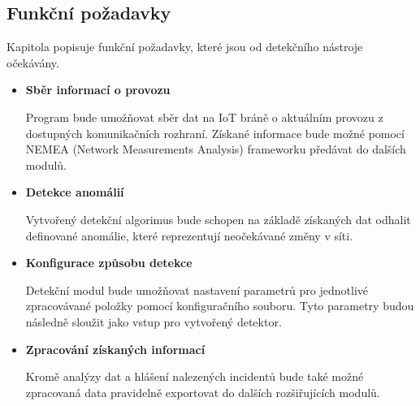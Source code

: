   \subsection{Funkční požadavky}
  Kapitola popisuje funkční požadavky, které jsou od detekčního nástroje očekávány.
  \begin{itemize}
   \item \textbf{Sběr informací o provozu}
   
   Program bude umožňovat sběr dat na IoT bráně o aktuálním provozu z dostupných komunikačních
   rozhraní. Získané informace bude možné pomocí NEMEA \cite{nemea} (Network Measurements Analysis)
   frameworku předávat do dalších modulů.
   
   \item \textbf{Detekce anomálií}
   
   Vytvořený detekční algorimus bude schopen na základě získaných dat odhalit definované anomálie,
   které reprezentují neočekávané změny v síti. 
   
   \item \textbf{Konfigurace způsobu detekce}
   
   Detekční modul bude umožňovat nastavení parametrů pro jednotlivé zpracovávané položky
   pomocí konfiguračního souboru. Tyto 
   parametry budou následně sloužit jako vstup pro vytvořený detektor.
   
   \item \textbf{Zpracování získaných informací}
   
   Kromě analýzy dat a hlášení nalezených incidentů bude také možné zpracovaná data pravidelně 
   exportovat do dalších rozšiřujících modulů.
  \end{itemize}

